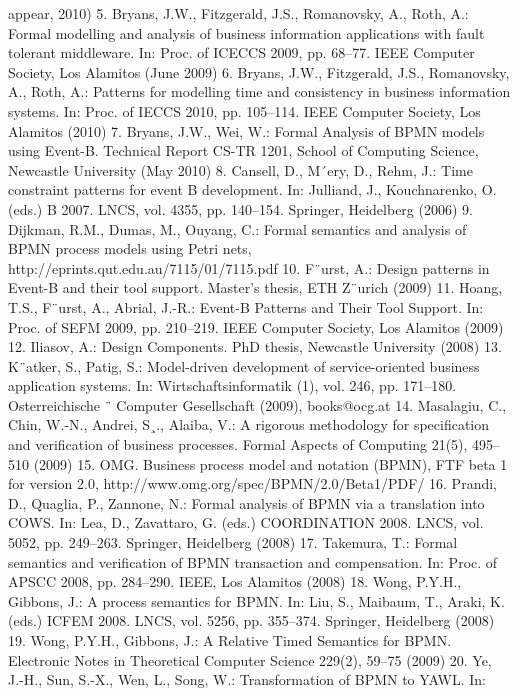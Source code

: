 appear, 2010)
5. Bryans, J.W., Fitzgerald, J.S., Romanovsky, A., Roth, A.: Formal modelling and
analysis of business information applications with fault tolerant middleware. In:
Proc. of ICECCS 2009, pp. 68–77. IEEE Computer Society, Los Alamitos (June
2009)
6. Bryans, J.W., Fitzgerald, J.S., Romanovsky, A., Roth, A.: Patterns for modelling
time and consistency in business information systems. In: Proc. of IECCS 2010,
pp. 105–114. IEEE Computer Society, Los Alamitos (2010)
7. Bryans, J.W., Wei, W.: Formal Analysis of BPMN models using Event-B. Technical
Report CS-TR 1201, School of Computing Science, Newcastle University (May
2010)
8. Cansell, D., M´ery, D., Rehm, J.: Time constraint patterns for event B development.
In: Julliand, J., Kouchnarenko, O. (eds.) B 2007. LNCS, vol. 4355, pp. 140–154.
Springer, Heidelberg (2006)
9. Dijkman, R.M., Dumas, M., Ouyang, C.: Formal semantics and analysis of BPMN
process models using Petri nets, http://eprints.qut.edu.au/7115/01/7115.pdf
10. F¨urst, A.: Design patterns in Event-B and their tool support. Master’s thesis, ETH
Z¨urich (2009)
11. Hoang, T.S., F¨urst, A., Abrial, J.-R.: Event-B Patterns and Their Tool Support. In:
Proc. of SEFM 2009, pp. 210–219. IEEE Computer Society, Los Alamitos (2009)
12. Iliasov, A.: Design Components. PhD thesis, Newcastle University (2008)
13. K¨atker, S., Patig, S.: Model-driven development of service-oriented business application systems. In: Wirtschaftsinformatik (1), vol. 246, pp. 171–180. Osterreichische ¨
Computer Gesellschaft (2009), books@ocg.at
14. Masalagiu, C., Chin, W.-N., Andrei, S¸., Alaiba, V.: A rigorous methodology for
specification and verification of business processes. Formal Aspects of Computing 21(5), 495–510 (2009)
15. OMG. Business process model and notation (BPMN), FTF beta 1 for version 2.0,
http://www.omg.org/spec/BPMN/2.0/Beta1/PDF/
16. Prandi, D., Quaglia, P., Zannone, N.: Formal analysis of BPMN via a translation
into COWS. In: Lea, D., Zavattaro, G. (eds.) COORDINATION 2008. LNCS,
vol. 5052, pp. 249–263. Springer, Heidelberg (2008)
17. Takemura, T.: Formal semantics and verification of BPMN transaction and compensation. In: Proc. of APSCC 2008, pp. 284–290. IEEE, Los Alamitos (2008)
18. Wong, P.Y.H., Gibbons, J.: A process semantics for BPMN. In: Liu, S., Maibaum,
T., Araki, K. (eds.) ICFEM 2008. LNCS, vol. 5256, pp. 355–374. Springer, Heidelberg (2008)
19. Wong, P.Y.H., Gibbons, J.: A Relative Timed Semantics for BPMN. Electronic
Notes in Theoretical Computer Science 229(2), 59–75 (2009)
20. Ye, J.-H., Sun, S.-X., Wen, L., Song, W.: Transformation of BPMN to YAWL. In:
